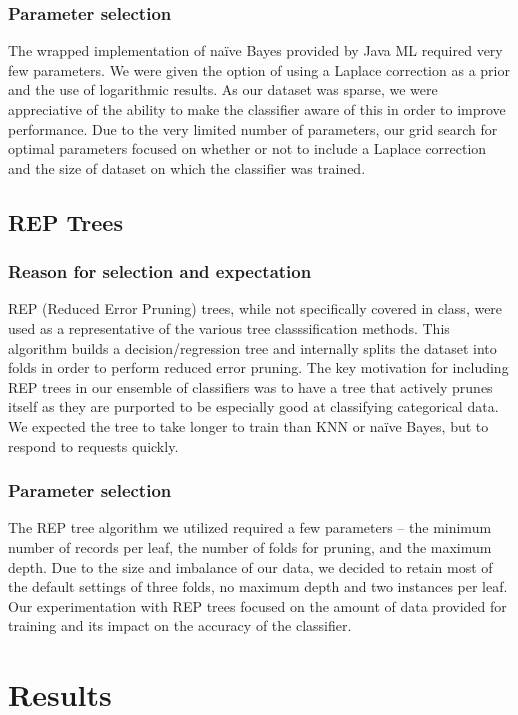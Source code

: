 \documentclass[]{article}   %
\begin{document}
\subsubsection{Parameter selection}
The wrapped implementation of na\"{i}ve Bayes provided by Java ML required very few parameters. We were given the option of using a Laplace correction as a prior and the use of logarithmic results. As our dataset was sparse, we were appreciative of the ability to make the classifier aware of this in order to improve performance. Due to the very limited number of parameters, our grid search for optimal parameters focused on whether or not to include a Laplace correction and the size of dataset on which the classifier was trained. 

\subsection{REP Trees}
\subsubsection{Reason for selection and expectation}
REP (Reduced Error Pruning) trees, while not specifically covered in class, were used as a representative of the various tree classsification methods. This algorithm builds a decision/regression tree and internally splits the dataset into folds in order to perform reduced error pruning. The key motivation for including REP trees in our ensemble of classifiers was to have a tree that actively prunes itself as they are purported to be especially good at classifying categorical data. We expected the tree to take longer to train than KNN or na\"{i}ve Bayes, but to respond to requests quickly.

\subsubsection{Parameter selection}
The REP tree algorithm we utilized required a few parameters -- the minimum number of records per leaf, the number of folds for pruning, and the maximum depth. Due to the size and imbalance of our data, we decided to retain most of the default settings of three folds, no maximum depth and two instances per leaf. Our experimentation with REP trees focused on the amount of data provided for training and its impact on the accuracy of the classifier.

\section{Results}
\end{document}

